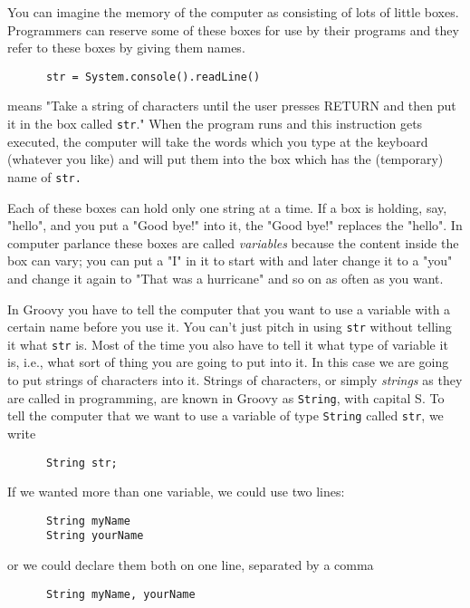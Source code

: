 You can imagine the memory of the computer as consisting of lots of
little boxes.  Programmers can reserve some of these boxes for
use by their programs and they refer to these boxes by giving
them names.  

\begin{Verbatim}
      str = System.console().readLine()
\end{Verbatim}

means "Take a string of characters until the user presses RETURN and
then put it in the box called \verb!str!."  When the program runs and
this instruction gets executed, the computer will take the words which
you type at the keyboard (whatever you like) and will put them into
the box which has the (temporary) name of \verb!str.!

Each of these boxes can hold only one string at a time.  If a box is
holding, say, "hello", and you put a "Good bye!" into it, the
"Good bye!" replaces the "hello".  In computer parlance these
boxes are called \emph{variables} because the content inside the box
can vary; you can put a "I" in it to start with and later change it
to a "you" and change it again to "That was a hurricane" and so on
as often as you want.

In Groovy you have to tell the computer that you want to use a variable
with a certain name before you use it.  You can't just pitch in using \verb!str!
without telling it what \verb!str! is.  Most of the time you also have to
tell it what type of variable it is, i.e., what sort of thing you are going
to put into it.  In this case we are going to put strings of characters into it.
Strings of characters, or simply \emph{strings} as they are called in programming, are
known in Groovy as \verb!String!, with capital S.  To tell the computer that we want to use a
variable of type \verb!String! called \verb!str!, we write

\begin{Verbatim}
      String str;
\end{Verbatim}

If we wanted more than one variable, we could use two lines:

\begin{Verbatim}
      String myName
      String yourName
\end{Verbatim}

or we could declare them both on one line, separated by a comma
\begin{Verbatim}
      String myName, yourName
\end{Verbatim}

